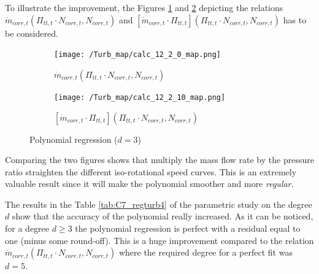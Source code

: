 To illustrate the improvement, the Figures \ref{fig:C7_mturb3} and \ref{fig:C7_mturbevo} depicting the relations $\dot{m}_{corr,t}(\Pi_{tt,t}\cdot N_{corr,t},N_{corr,t})$ and $[\dot{m}_{corr,t}\cdot \Pi_{tt,t}](\Pi_{tt,t}\cdot N_{corr,t},N_{corr,t})$ has to be considered. 

\begin{figure}[H]
    \centering
    \begin{subfigure}[b]{0.4\textwidth}
        \centering
        \texttt{[image: /Turb\_map/calc\_12\_2\_0\_map.png]}
        \caption{$\dot{m}_{corr,t}(\Pi_{tt,t}\cdot N_{corr,t},N_{corr,t})$}
        \label{fig:C7_mturb3}
    \end{subfigure}
    \begin{subfigure}[b]{0.4\textwidth}
        \centering
        \texttt{[image: /Turb\_map/calc\_12\_2\_10\_map.png]}
        \caption{$[\dot{m}_{corr,t}\cdot \Pi_{tt,t}](\Pi_{tt,t}\cdot N_{corr,t},N_{corr,t})$}
        \label{fig:C7_mturbevo}
    \end{subfigure}
    \caption{Polynomial regression ($d=3$)} \label{fig:C7_polycomp_m_turb}
\end{figure}

Comparing the two figures shows that multiply the mass flow rate by the pressure ratio straighten the different iso-rotational speed curves. This is an extremely valuable result since it will make the polynomial smoother and more \textit{regular}.

The results in the Table \ref{tab:C7_regturb4} of the parametric study on the degree $d$ show that the accuracy of the polynomial really increased. As it can be noticed, for a degree $d\geq 3$ the polynomial regression is perfect with a residual equal to one (minus some round-off). This is a huge improvement compared to the relation $\dot{m}_{corr,t}(\Pi_{tt,t}\cdot N_{corr,t},N_{corr,t})$ where the required degree for a perfect fit was $d=5$.

